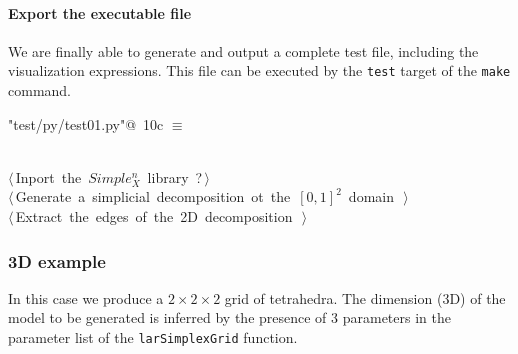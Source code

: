 \documentclass[11pt,oneside]{article}	%
\begin{document}
\paragraph{Export the executable file}
We are finally able to generate and output a complete test file, including the visualization expressions. This file can be executed by the \texttt{test} target of the \texttt{make} command.

\begin{flushleft} \small \label{scrap13}
\protect{}\verb@"test/py/test01.py"@\nobreak\ {\footnotesize 10c }$\equiv$
\vspace{-1ex}
\begin{list}{}{} \item
\mbox{}\verb@@\\
\mbox{}\verb@@\hbox{$\langle\,$Inport the $Simple_X^n$ library\nobreak\ {\footnotesize ?}$\,\rangle$}\verb@@\\
\mbox{}\verb@@\hbox{$\langle\,$Generate a simplicial decomposition ot the $[0,1]^2$ domain\nobreak\ {\footnotesize {}}$\,\rangle$}\verb@@\\
\mbox{}\verb@@\hbox{$\langle\,$Extract the edges of the 2D decomposition\nobreak\ {\footnotesize {}}$\,\rangle$}\verb@@\\
\mbox{}\verb@@{\NWsep}
\end{list}
\vspace{-2ex}
\end{flushleft}

\subsubsection{3D example}

In this case we produce a $2\times 2\times 2$ grid of tetrahedra. The dimension (3D) of the model to be generated is inferred by the presence of 3 parameters in the parameter list of the \texttt{larSimplexGrid} function. 
\end{document}
